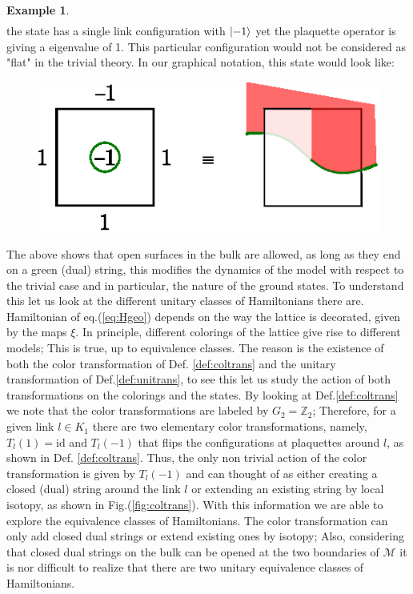 \documentclass[%
nofootinbib,
 amsmath,amssymb,
aps,
]{revtex4-1}
\theoremstyle{plain}%
\theoremstyle{definition}
\newtheorem{exmp}[thm]{Example}
\theoremstyle{remark}
\begin{document}
\begin{exmp}
\begin{align*}
\end{align*}
the state has a single link configuration with $\ket{-1}$ yet the plaquette operator is giving a eigenvalue of 1. This particular configuration would not be considered as "flat" in the trivial theory. In our graphical notation, this state would look like:
\begin{figure}[h!]
\centering
\includegraphics[scale=0.8]{graph2.eps}
\end{figure}
\end{exmp}
The above shows that open surfaces in the bulk are allowed, as long as they end on a green (dual) string, this modifies the dynamics of the model with respect to the trivial case and in particular, the nature of the ground states. To understand this let us look at the different unitary classes of Hamiltonians there are. Hamiltonian of eq.(\ref{eq:Hgeo}) depends on the way the lattice is decorated, given by the maps $\xi$. In principle, different colorings of the lattice give rise to different models; This is true, up to equivalence classes. 
The reason is the existence of both the color transformation of Def. \ref{def:coltrans} and the unitary transformation of Def.\ref{def:unitrans}, to see this let us study the action of both transformations on the colorings and the states. By looking at Def.\ref{def:coltrans} we note that the color transformations are labeled by \(G_2= \mathbb{Z}_2\); Therefore, for a given link \(l \in K_1\) there are two elementary color transformations, namely, \(T_l(1)= \text{id}\) and \(T_l(-1)\) that flips the configurations at plaquettes around \(l\), as shown in Def. \ref{def:coltrans}. Thus, the only non trivial action of the color transformation is given by \(T_l(-1)\) and can thought of as either creating a closed (dual) string around the link \(l\) or extending an existing string by local isotopy, as shown in Fig.(\ref{fig:coltrans}).
With this information we are able to explore the equivalence classes of Hamiltonians. The color transformation can only add closed dual strings or extend existing ones by isotopy; Also, considering that closed dual strings on the bulk can be opened at the two boundaries of \(\mathcal{M}\) it is nor difficult to realize that there are two unitary equivalence classes of Hamiltonians.
\end{document}
